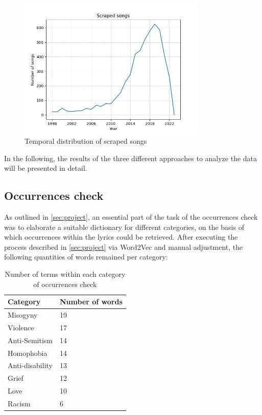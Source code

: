 \begin{figure}[!htb]
    \centering
    \includegraphics[width=0.8\textwidth]{figures/number_of_songs.png}
    \caption{Temporal distribution of scraped songs}
    \label{fig:number_songs}
\end{figure}

In the following, the results of the three different approaches to analyze the data will be presented in detail.

\subsection*{Occurrences check}

As outlined in \autoref*{sec:project}, an essential part of the task of the occurrences check was to elaborate a suitable dictionary for different categories, on the basis of which occurrences within the lyrics could be retrieved. After executing the process described in \autoref{sec:project} via Word2Vec and manual adjustment, the following quantities of words remained per category:

\def\arraystretch{1.2}
\begin{table}[!hbt]
    \centering
    \begin{tabular}{|l|l|}
    \hline
    \textbf{Category} & \textbf{Number of words} \\ \hline
    Misogyny        & 19 \\ \hline
    Violence        & 17 \\ \hline
    Anti-Semitism   & 14 \\ \hline
    Homophobia      & 14 \\ \hline
    Anti-disability & 13 \\ \hline
    Grief           & 12 \\ \hline
    Love            & 10 \\ \hline
    Racism          & 6  \\ \hline
    \end{tabular}
    \caption{Number of terms within each category of occurrences check}
    \label{tab:dictionary}
\end{table}

